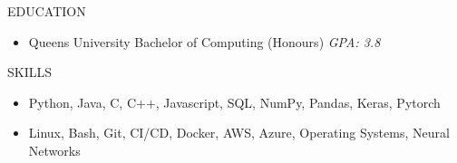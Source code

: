 \documentclass[]{mcdowellcv}
\begin{document}
\begin{cvsection}{EDUCATION}
	\begin{cvsubsection}{}{}{}
		\begin{itemize}
			\item Queen\textquotesingle{}s University \textbar{} Bachelor of Computing (Honours) \textbar{} \textit{GPA: 3.8}
		\end{itemize}
	\end{cvsubsection}
\end{cvsection}

\begin{cvsection}{SKILLS}
	\begin{cvsubsection}{}{}{}
		\begin{itemize}
			\item  Python, Java, C, C++, Javascript, SQL, NumPy, Pandas, Keras, Pytorch
			\item  Linux, Bash, Git, CI/CD, Docker, AWS, Azure, Operating Systems, Neural Networks
		\end{itemize}
	\end{cvsubsection}
\end{cvsection}
\
\end{document}
